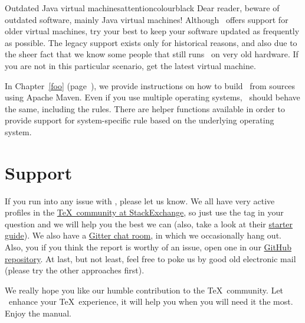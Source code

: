 \begin{messagebox}{Outdated Java virtual machines}{attentioncolour}{\icerror}{black}
Dear reader, beware of outdated software, mainly Java virtual machines! Although \arara\ offers support for older virtual machines, try your best to keep your software updated as frequently as possible. The legacy support exists only for historical reasons, and also due to the sheer fact that we know some people that still runs \arara\ on very old hardware. If you are not in this particular scenario, get the latest virtual machine.
\end{messagebox}

In Chapter~\ref{foo} (page~\pageref{foo}), we provide instructions on how to build \arara\ from sources using Apache Maven. Even if you use multiple operating systems, \arara\ should behave the same, including the rules. There are helper functions available in order to provide support for system-specific rule based on the underlying operating system.

\section{Support}
\label{sec:support}

If you run into any issue with \arara, please let us know. We all have very active profiles in the \href{https://tex.stackexchange.com/}{\TeX\ community at StackExchange}, so just use the  tag in your question and we will help you the best we can (also, take a look at their \href{https://tex.meta.stackexchange.com/q/1436}{starter guide}).  We also have a \href{https://gitter.im/cereda/arara}{Gitter chat room}, in which we occasionally hang out. Also, you if you think the report is worthy of an issue, open one in our \href{https://github.com/cereda/arara/issues}{GitHub repository}. At last, but not least, feel free to poke us by good old electronic mail (please try the other approaches first).

We really hope you like our humble contribution to the \TeX\ community. Let \arara\ enhance your \TeX\ experience, it will help you when you will need it the most. Enjoy the manual.
